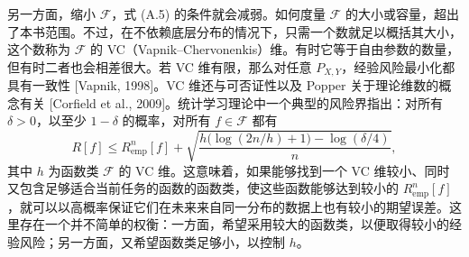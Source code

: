 另一方面，缩小 $\mathcal F$，式 (A.5) 的条件就会减弱。如何度量 $\mathcal F$ 的大小或容量，超出了本书范围。不过，在不依赖底层分布的情况下，只需一个数就足以概括其大小，这个数称为 $\mathcal F$ 的 VC（Vapnik--Chervonenkis）维。有时它等于自由参数的数量，但有时二者也会相差很大。若 VC 维有限，那么对任意 $P_{X,Y}$，经验风险最小化都具有一致性 [Vapnik, 1998]。VC 维还与可否证性以及 Popper 关于理论维数的概念有关 [Corfield et al., 2009]。统计学习理论中一个典型的风险界指出：对所有 $\delta>0$，以至少 $1-\delta$ 的概率，对所有 $f\in\mathcal F$ 都有
\begin{equation}
R[f]\le R_{\mathrm{emp}}^n[f]+
\sqrt{\frac{h\big(\log(2n/h)+1\big)-\log(\delta/4)}{n}},
\tag{A.6}
\end{equation}
其中 $h$ 为函数类 $\mathcal F$ 的 VC 维。这意味着，如果能够找到一个 VC 维较小、同时又包含足够适合当前任务的函数的函数类，使这些函数能够达到较小的 $R_{\mathrm{emp}}^n[f]$，就可以以高概率保证它们在未来来自同一分布的数据上也有较小的期望误差。这里存在一个并不简单的权衡：一方面，希望采用较大的函数类，以便取得较小的经验风险；另一方面，又希望函数类足够小，以控制 $h$。
